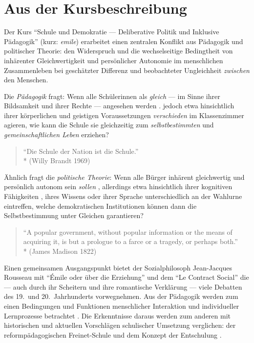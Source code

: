\section[Kursbeschreibung]{Aus der Kursbeschreibung}

Der Kurs ``Schule und Demokratie --- Deliberative Politik und Inklusive Pädagogik'' (kurz: \emph{emile}) erarbeitet einen zentralen Konflikt aus Pädagogik und politischer Theorie:
den Widerspruch und die wechselseitige Bedingtheit von inhärenter Gleichwertigkeit und persönlicher Autonomie im menschlichen Zusammenleben bei geschätzter Differenz und beobachteter Ungleichheit \emph{zwischen} den Menschen.

Die \emph{Pädagogik} fragt:
Wenn alle Schülerinnen als \emph{gleich} --- im Sinne ihrer Bildsamkeit und ihrer Rechte --- angesehen werden \parencites[vgl.][]{UN-2008,benner-2012}.
jedoch etwa hinsichtlich ihrer körperlichen und geistigen Voraussetzungen \emph{verschieden} im Klassenzimmer agieren, wie kann die Schule sie gleichzeitig zum \emph{selbstbestimmten} und \emph{gemeinschaftlichen Leben} erziehen?

\begin{quote}
    ``Die Schule der Nation ist die Schule.''\\*
    (Willy Brandt 1969)
\end{quote}

Ähnlich fragt die \emph{politische Theorie}:
Wenn alle Bürger inhärent gleichwertig und persönlich autonom sein \emph{sollen} \parencite[etwa][]{Dahl-1989-aa}, allerdings etwa hinsichtlich ihrer kognitiven Fähigkeiten \parencite{Rosenberg-2002-aa}, ihres Wissens \parencite[etwa][]{Converse-1970-aa} oder ihrer Sprache unterschiedlich an der Wahlurne eintreffen, welche demokratischen Institutionen können dann die Selbstbestimmung unter Gleichen garantieren?

\begin{quote}
    ``A popular government, without popular information or the means of acquiring it, is but a prologue to a farce or a tragedy, or perhaps both.''\\*
    (James Madison 1822)
\end{quote}

Einen gemeinsamen Ausgangspunkt bietet der Sozialphilosoph Jean-Jacques Rousseau mit ``Émile oder über die Erziehung'' \parencite{rousseau1762} und dem ``Le Contract Social'' \parencite*{Rousseau-1762-b} die --- auch durch ihr Scheitern und ihre romantische Verklärung --- viele Debatten des 19.\ und 20.\ Jahrhunderts vorwegnehmen.
Aus der Pädagogik werden zum einen Bedingungen und Funktionen menschlicher Interaktion und individueller Lernprozesse betrachtet \parencites{siebert-2003,benner-2012,mead-1934en}.
Die Erkenntnisse daraus werden zum anderen mit historischen und aktuellen Vorschlägen schulischer Umsetzung verglichen: der reformpädagogischen Freinet-Schule und dem Konzept der Entschulung \parencites{Freinet1979,Illich-1971}.

